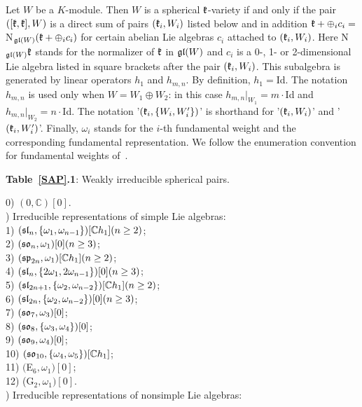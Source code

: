 \documentclass[12pt]{amsart}
\theoremstyle{definition}\newtheorem{theorem}{Theorem}[section]
\theoremstyle{definition}\newtheorem{definition}[proposition]{Definition}
\theoremstyle{remark}\newtheorem{example}[proposition]{Example}
\newcounter{AP}
\begin{document}
Let $W$ be a $K$-module. Then $W$ is a spherical $\frak k$-variety if and only if the pair $([\frak k, \frak k], W)$ is a direct sum of pairs $(\frak k_i, W_i)$ listed below and in addition $\frak k+\oplus_i c_i=$N$_{\frak{gl}(W)}(\frak k+\oplus_i c_i)$ for certain abelian Lie algebras $c_i$ attached to $(\frak k_i, W_i)$. Here N$_{\frak{gl}(W)}\frak k$ stands for the normalizer of $\frak k$ in $\frak{gl}(W)$ and $c_i$ is a 0-, 1- or 2-dimensional Lie algebra listed in square brackets after the pair $(\frak k_i, W_i)$. This subalgebra is generated by linear operators $h_1$ and $h_{m, n}$. By definition, $h_1=$Id. The notation $h_{m, n}$ is used only when $W=W_1\oplus W_2$: in this case $h_{m, n}|_{W_1}=m\cdot$Id and $h_{m, n}|_{W_2}=n\cdot$Id. The notation '$(\frak k_i, \{W_i, W_i'\})$' is shorthand for '$(\frak k_i, W_i)$' and '$(\frak k_i, W_i')$'. Finally, $\omega_i$ stands for the $i$-th fundamental weight and the corresponding fundamental representation. We follow the enumeration convention for fundamental weights of~\cite{OV}.
\begin{center}{\bfseries Table~\ref{SAP}.1}: Weakly irreducible spherical pairs.\end{center}
0) $(0, \mathbb C) [0]$.\\
\setcounter{AP}{1}) Irreducible representations of simple Lie algebras:\\
1) $(\frak{sl}_n, \{\omega_1, \omega_{n-1}\}) [\mathbb Ch_1] (n\ge 2)$;\\2) $(\frak{so}_n, \omega_1) [0] (n\ge 3)$;\\3) $(\frak{sp}_{2n}, \omega_1) [\mathbb Ch_1] (n\ge 2)$;\\4) $(\frak{sl}_n, \{2\omega_1, 2\omega_{n-1}\}) [0] (n\ge 3)$;\\5) $(\frak{sl}_{2n+1}, \{\omega_2, \omega_{n-2}\}) [\mathbb Ch_1] (n\ge 2)$;\\6) $(\frak{sl}_{2n}, \{\omega_2, \omega_{n-2}\}) [0] (n\ge 3)$;\\7) $(\frak{so}_7, \omega_3) [0]$;\\8) $(\frak{so}_8, \{\omega_3, \omega_4\}) [0]$;\\9) $(\frak{so}_9, \omega_4) [0]$;\\10) $(\frak{so}_{10}, \{\omega_4, \omega_5\}) [\mathbb Ch_1]$;\\11) $($E$_6, \omega_1) [0]$;\\12) (G$_2, \omega_1 ) [0]$.\\
\setcounter{AP}{2}) Irreducible representations of nonsimple Lie algebras:\\
\end{document}
